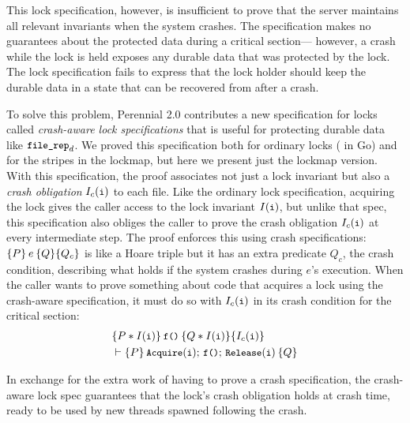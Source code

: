 This lock specification, however, is insufficient to prove that the \simplenfs server maintains all relevant invariants when the system crashes.
The specification makes no guarantees about the protected data during
a critical section---%
however, a crash while the lock is held exposes any durable data that
was protected by the lock. The lock specification fails to express that the lock
holder should keep the durable data in a state that can be recovered from after a crash.

To solve this problem, Perennial 2.0 contributes a new
specification for locks called \emph{crash-aware lock specifications}
that is useful for protecting durable data like $\cc{file_rep}_{d}$. We proved
this specification both for ordinary locks ( in Go) and
for the stripes in the lockmap, but here we present just the lockmap version.
With this specification, the
proof associates not just a lock invariant but also a \emph{crash obligation} $I_c(\cc{i})$ to each file. Like the ordinary
lock specification, acquiring the lock gives the caller access to the lock
invariant $I(\cc{i})$, but unlike that spec, this specification also obliges the
caller to prove the crash obligation $I_c(\cc{i})$ at every intermediate step. The proof
enforces this using crash specifications:
$\hoareC{P}{e}{Q}{Q_{c}}$ is like a Hoare triple but it has an extra predicate
$Q_{c}$, the crash condition, describing what holds if the system crashes during $e$'s execution.
When the caller wants to prove something about code that acquires a lock using
the crash-aware specification, it must do so with $I_c(\cc{i})$ in its crash
condition for the critical section:
%
\begin{align*}
&\hoareC{P \sep I(\cc{i})}{\cc{f()}}{Q \sep I(\cc{i})}{I_c(\cc{i})} \\
&\vdash \hoare{P}{\cc{Acquire}(\cc{i});\, \cc{f()};\, \cc{Release}(\cc{i})}{Q}
\end{align*}

In exchange for the extra work of having to prove a crash specification, the crash-aware
lock spec guarantees
that the lock's crash obligation holds at crash time, ready to be
used by new threads spawned following the crash.

